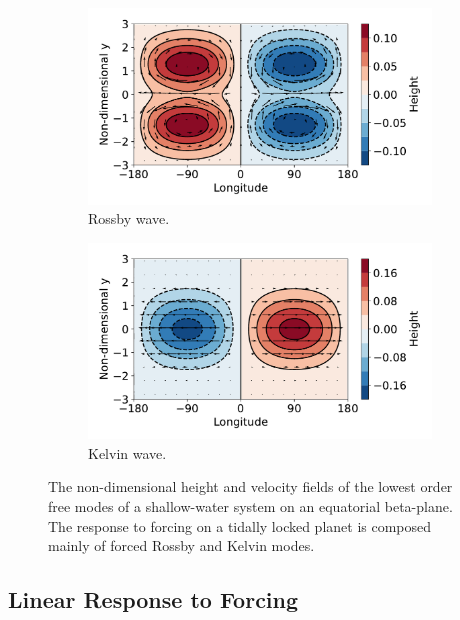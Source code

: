 \begin{figure}
  \centering
  \begin{subfigure}[t]{0.49\textwidth}
    \includegraphics[width=1.0\textwidth]{figures/eqm-zonal-flow/beta-plane-free-rossby.pdf}
    \caption{Rossby wave.}
    \label{fig:beta-plane-free-rossby}
  \end{subfigure}
  \begin{subfigure}[t]{0.49\textwidth}
    \includegraphics[width=1.0\textwidth]{figures/eqm-zonal-flow/beta-plane-free-kelvin.pdf}
    \caption{Kelvin wave.}
    \label{beta-plane-free-kelvin}
  \end{subfigure}
  \caption{The non-dimensional height and velocity fields of the lowest order free modes of a shallow-water system on an equatorial beta-plane. The response to forcing on a tidally locked planet is composed mainly of forced Rossby and Kelvin modes.}
  \label{fig:beta-plane-free-rossby-kelvin}
\end{figure}


\subsection{Linear Response to Forcing}

